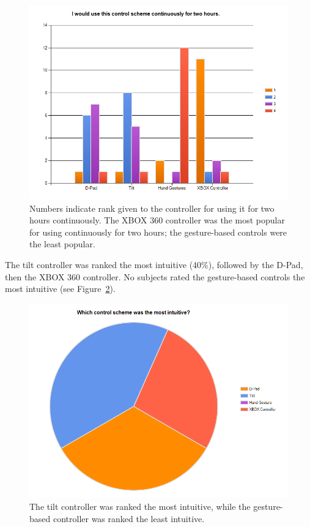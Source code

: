 \documentclass[12pt,a4paper]{report}
\begin{document}
\begin{figure}[h!]
	\centering
	\includegraphics[width=5in]{images/sm_51.png}
	\caption{Numbers indicate rank given to the controller for using it for two hours continuously. The XBOX 360 controller was the most popular for using continuously for two hours; the gesture-based controls were the least popular.}
	\label{sm_51}
\end{figure}

The tilt controller was ranked the most intuitive (40\%), followed by the D-Pad, then the XBOX 360 controller. No subjects rated the gesture-based controls the most intuitive (see Figure~\ref{sm_52}).

\begin{figure}[h!]
	\centering
	\includegraphics[width=5in]{images/sm_52.png}
	\caption{The tilt controller was ranked the most intuitive, while the gesture-based controller was ranked the least intuitive.}
	\label{sm_52}
\end{figure}
\end{document}
